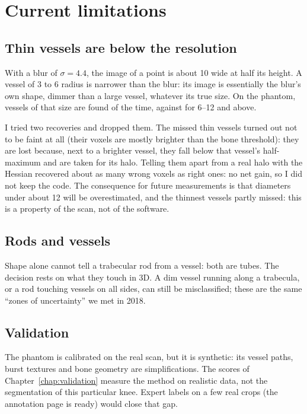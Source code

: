 \chapter{Current limitations}
\label{chap:limitations}

\section{Thin vessels are below the resolution}
\label{sec:thin}

With a blur of $\sigma = 4.4$\um{}, the image of a point is about 10\um{} wide at half its height. A
vessel of 3 to 6\um{} radius is narrower than the blur: its image is essentially the blur's own shape,
dimmer than a large vessel, whatever its true size. On the phantom, vessels of that size are found
\pbValueVesselRecallThin{} of the time, against \pbValueVesselRecallMedium{} for 6--12\um{} and
\pbValueVesselRecallLarge{} above.

I tried two recoveries and dropped them. The missed thin vessels turned out not to be faint at all (their
voxels are mostly brighter than the bone threshold): they are lost because, next to a brighter vessel,
they fall below that vessel's half-maximum and are taken for its halo. Telling them apart from a real
halo with the Hessian recovered about as many wrong voxels as right ones: no net gain, so I did not
keep the code. The
consequence for future measurements is that diameters under about 12\um{} will be overestimated, and
the thinnest vessels partly missed: this is a property of the scan, not of the software.

\section{Rods and vessels}

Shape alone cannot tell a trabecular rod from a vessel: both are tubes. The decision rests on what they
touch in 3D. A dim vessel running along a trabecula, or a rod touching vessels on all sides, can still
be misclassified; these are the same ``zones of uncertainty'' we met in 2018.

\section{Validation}

The phantom is calibrated on the real scan, but it is synthetic: its vessel paths, burst textures and
bone geometry are simplifications. The scores of Chapter~\ref{chap:validation} measure the method on
realistic data, not the segmentation of this particular knee. Expert labels on a few real crops (the
annotation page is ready) would close that gap.

